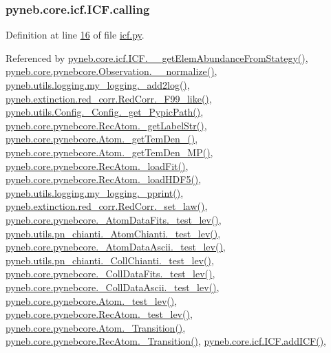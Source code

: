 \hypertarget{classpyneb_1_1core_1_1icf_1_1_i_c_f_aaeb9b3827ef557a32b109baef31da77f}{
\subsubsection[{calling}]{\setlength{\rightskip}{0pt plus 5cm}pyneb.\-core.\-icf.\-I\-C\-F.\-calling}}\label{classpyneb_1_1core_1_1icf_1_1_i_c_f_aaeb9b3827ef557a32b109baef31da77f}


Definition at line \hyperlink{icf_8py_source_l00016}{16} of file \hyperlink{icf_8py_source}{icf.\-py}.



Referenced by \hyperlink{icf_8py_source_l01075}{pyneb.\-core.\-icf.\-I\-C\-F.\-\_\-\-\_\-get\-Elem\-Abundance\-From\-Stategy()}, \hyperlink{pynebcore_8py_source_l04007}{pyneb.\-core.\-pynebcore.\-Observation.\-\_\-\-\_\-normalize()}, \hyperlink{logging_8py_source_l00059}{pyneb.\-utils.\-logging.\-my\-\_\-logging.\-\_\-add2log()}, \hyperlink{red__corr_8py_source_l00658}{pyneb.\-extinction.\-red\-\_\-corr.\-Red\-Corr.\-\_\-\-F99\-\_\-like()}, \hyperlink{_config_8py_source_l00115}{pyneb.\-utils.\-Config.\-\_\-\-Config.\-\_\-get\-\_\-\-Pypic\-Path()}, \hyperlink{pynebcore_8py_source_l02970}{pyneb.\-core.\-pynebcore.\-Rec\-Atom.\-\_\-get\-Label\-Str()}, \hyperlink{pynebcore_8py_source_l01869}{pyneb.\-core.\-pynebcore.\-Atom.\-\_\-get\-Tem\-Den\-\_()}, \hyperlink{pynebcore_8py_source_l02046}{pyneb.\-core.\-pynebcore.\-Atom.\-\_\-get\-Tem\-Den\-\_\-\-M\-P()}, \hyperlink{pynebcore_8py_source_l02754}{pyneb.\-core.\-pynebcore.\-Rec\-Atom.\-\_\-load\-Fit()}, \hyperlink{pynebcore_8py_source_l02714}{pyneb.\-core.\-pynebcore.\-Rec\-Atom.\-\_\-load\-H\-D\-F5()}, \hyperlink{logging_8py_source_l00051}{pyneb.\-utils.\-logging.\-my\-\_\-logging.\-\_\-pprint()}, \hyperlink{red__corr_8py_source_l00176}{pyneb.\-extinction.\-red\-\_\-corr.\-Red\-Corr.\-\_\-set\-\_\-law()}, \hyperlink{pynebcore_8py_source_l00178}{pyneb.\-core.\-pynebcore.\-\_\-\-Atom\-Data\-Fits.\-\_\-test\-\_\-lev()}, \hyperlink{pn__chianti_8py_source_l00304}{pyneb.\-utils.\-pn\-\_\-chianti.\-\_\-\-Atom\-Chianti.\-\_\-test\-\_\-lev()}, \hyperlink{pynebcore_8py_source_l00447}{pyneb.\-core.\-pynebcore.\-\_\-\-Atom\-Data\-Ascii.\-\_\-test\-\_\-lev()}, \hyperlink{pn__chianti_8py_source_l00472}{pyneb.\-utils.\-pn\-\_\-chianti.\-\_\-\-Coll\-Chianti.\-\_\-test\-\_\-lev()}, \hyperlink{pynebcore_8py_source_l00677}{pyneb.\-core.\-pynebcore.\-\_\-\-Coll\-Data\-Fits.\-\_\-test\-\_\-lev()}, \hyperlink{pynebcore_8py_source_l01045}{pyneb.\-core.\-pynebcore.\-\_\-\-Coll\-Data\-Ascii.\-\_\-test\-\_\-lev()}, \hyperlink{pynebcore_8py_source_l01525}{pyneb.\-core.\-pynebcore.\-Atom.\-\_\-test\-\_\-lev()}, \hyperlink{pynebcore_8py_source_l02672}{pyneb.\-core.\-pynebcore.\-Rec\-Atom.\-\_\-test\-\_\-lev()}, \hyperlink{pynebcore_8py_source_l01433}{pyneb.\-core.\-pynebcore.\-Atom.\-\_\-\-Transition()}, \hyperlink{pynebcore_8py_source_l02812}{pyneb.\-core.\-pynebcore.\-Rec\-Atom.\-\_\-\-Transition()}, \hyperlink{icf_8py_source_l00797}{pyneb.\-core.\-icf.\-I\-C\-F.\-add\-I\-C\-F()}, 